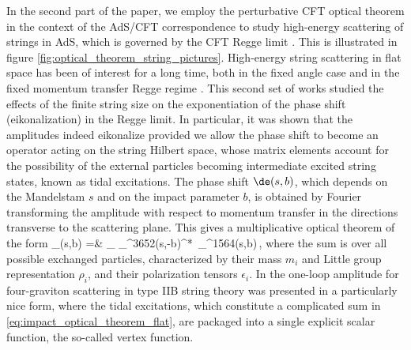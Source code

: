 In the second part of the paper, we employ the perturbative CFT optical theorem in the context of the AdS/CFT correspondence \cite{Maldacena:1997re,Witten:1998qj,Gubser:1998bc}
to study high-energy scattering of strings in AdS, which is governed by the CFT Regge limit \cite{Cornalba:2006xk,Cornalba:2006xm}. This is illustrated in figure \ref{fig:optical_theorem_string_pictures}.
High-energy string scattering in flat space has been of interest for a long time, both in the fixed angle case \cite{Gross:1987kza,Gross:1987ar} and in the fixed momentum transfer Regge regime \cite{Amati:1987wq,Amati:1987uf,Amati:1988tn}. This second set of works studied the effects of the finite string size on the exponentiation of the phase shift (eikonalization) in the Regge limit. In particular,
it was shown that the amplitudes indeed eikonalize provided we allow the phase shift to become an operator acting on the string Hilbert space, whose matrix elements account for the possibility of the external particles becoming intermediate excited string states, known as tidal excitations.
The phase shift $\de(s,b)$, which depends on the Mandelstam $s$ and on the impact parameter $b$, is
obtained by Fourier transforming the amplitude with respect to momentum transfer
in the directions transverse to the scattering plane. This gives a multiplicative optical theorem of the form
\bea
\Im \de_{}(s,b)
={}&  \sum\limits_{}
\de_^{3652}(s,-b)^* \,\de_^{1564}(s,b)\,,
where the sum is over all possible exchanged particles, characterized by their mass $m_i$ and Little group representation $\rho_i$,
and their polarization tensors $\epsilon_i$.
In \cite{Amati:1987uf} the one-loop amplitude for four-graviton scattering in type IIB string theory was presented in a particularly nice form, where the tidal excitations, which constitute a complicated sum in \eqref{eq:impact_optical_theorem_flat}, are packaged into a single explicit scalar function, the so-called vertex function.

